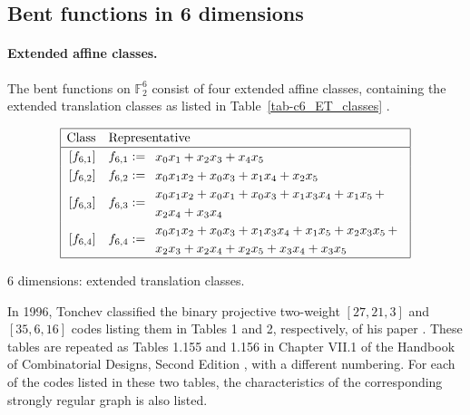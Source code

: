 \documentclass[12pt,a4paper]{article}
\newcommand{\mb}[1]{\mathbb{#1}}
\newcommand{\F}{\mb{F}}
\begin{document}
\subsection{Bent functions in 6 dimensions}
\paragraph*{Extended affine classes.}
%
The bent functions on $\F_2^6$ consist of four
extended affine classes, containing the extended translation classes as listed in Table~\ref{tab-c6_ET_classes}
\cite[p. 303]{Rot76} \cite[Section 7.2]{Tok15bent}.
\begin{table}[!bhpt] %
\small{
\begin{align*}
\def\arraystretch{1.2}
\begin{array}{|cl|}
\hline
\text{Class} &
\text{Representative}
\\
\hline
\,[f_{6,1}] & f_{6,1} :=
\begin{array}{l}
x_{0} x_{1} + x_{2} x_{3} + x_{4} x_{5}
\end{array}
\\
\,[f_{6,2}] & f_{6,2} :=
\begin{array}{l}
x_{0} x_{1} x_{2} + x_{0} x_{3} + x_{1} x_{4} + x_{2} x_{5}
\end{array}
\\
\,[f_{6,3}] & f_{6,3} :=
\begin{array}{l}
x_{0} x_{1} x_{2} + x_{0} x_{1} + x_{0} x_{3} + x_{1} x_{3} x_{4} + x_{1} x_{5}\, +
\\
x_{2} x_{4} + x_{3} x_{4}
\end{array}
\\
\,[f_{6,4}] & f_{6,4} :=
\begin{array}{l}
x_{0} x_{1} x_{2} + x_{0} x_{3} + x_{1} x_{3} x_{4} + x_{1} x_{5} + x_{2} x_{3} x_{5}\, +
\\
x_{2} x_{3} + x_{2} x_{4} + x_{2} x_{5} + x_{3} x_{4} + x_{3} x_{5}
\end{array}
\\
\hline
\end{array}
\end{align*}
}
\caption{6 dimensions: extended translation classes.}
\label{tab-c6_ET_classes}
\end{table}

In 1996, Tonchev classified the binary projective two-weight $[27,21,3]$ and $[35,6,16]$ codes
listing them in Tables 1 and 2, respectively, of his paper \cite{Ton96uniformly}.
These tables are repeated as Tables 1.155 and 1.156 in Chapter VII.1 of the Handbook of
Combinatorial Designs, Second Edition \cite{Ton07codes},
with a different numbering.
For each of the codes listed in these two tables, the characteristics of the corresponding
strongly regular graph is also listed.
\end{document}
